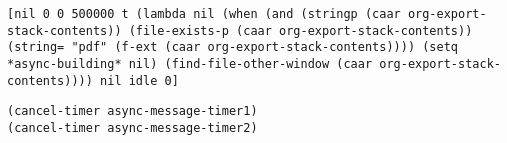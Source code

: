 \documentclass{article}
\begin{document}
\begin{verbatim}
[nil 0 0 500000 t (lambda nil (when (and (stringp (caar org-export-stack-contents)) (file-exists-p (caar org-export-stack-contents)) (string= "pdf" (f-ext (caar org-export-stack-contents)))) (setq *async-building* nil) (find-file-other-window (caar org-export-stack-contents)))) nil idle 0]
\end{verbatim}

\begin{verbatim}
(cancel-timer async-message-timer1)
(cancel-timer async-message-timer2)
\end{verbatim}
\end{document}
